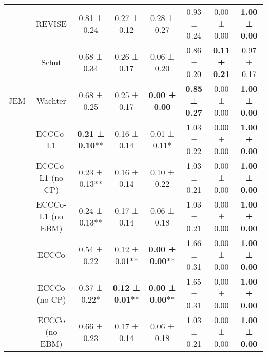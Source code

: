 \begin{table}
{\begin{tabular}[t]{cccccccc}
 & REVISE & 0.81 ± 0.24\hphantom{*}\hphantom{*} & 0.27 ± 0.12\hphantom{*}\hphantom{*} & 0.28 ± 0.27\hphantom{*}\hphantom{*} & 0.93 ± 0.24\hphantom{*}\hphantom{*} & 0.00 ± 0.00\hphantom{*}\hphantom{*} & \textbf{1.00 ± 0.00}\hphantom{*}\hphantom{*}\\

 & Schut & 0.68 ± 0.34\hphantom{*}\hphantom{*} & 0.26 ± 0.17\hphantom{*}\hphantom{*} & 0.06 ± 0.20\hphantom{*}\hphantom{*} & 0.86 ± 0.20\hphantom{*}\hphantom{*} & \textbf{0.11 ± 0.21}\hphantom{*}\hphantom{*} & 0.97 ± 0.17\hphantom{*}\hphantom{*}\\

\multirow[t]{-9}{*}{\centering\arraybackslash JEM} & Wachter & 0.68 ± 0.25\hphantom{*}\hphantom{*} & 0.25 ± 0.17\hphantom{*}\hphantom{*} & \textbf{0.00 ± 0.00}\hphantom{*}\hphantom{*} & \textbf{0.85 ± 0.27}\hphantom{*}\hphantom{*} & 0.00 ± 0.00\hphantom{*}\hphantom{*} & \textbf{1.00 ± 0.00}\hphantom{*}\hphantom{*}\\
\cmidrule{1-8}
 & ECCCo-L1 & \textbf{0.21 ± 0.10}** & 0.16 ± 0.14\hphantom{*}\hphantom{*} & 0.01 ± 0.11*\hphantom{*} & 1.03 ± 0.22\hphantom{*}\hphantom{*} & 0.00 ± 0.00\hphantom{*}\hphantom{*} & \textbf{1.00 ± 0.00}\hphantom{*}\hphantom{*}\\

 & ECCCo-L1 (no CP) & 0.23 ± 0.13** & 0.16 ± 0.14\hphantom{*}\hphantom{*} & 0.10 ± 0.22\hphantom{*}\hphantom{*} & 1.03 ± 0.21\hphantom{*}\hphantom{*} & 0.00 ± 0.00\hphantom{*}\hphantom{*} & \textbf{1.00 ± 0.00}\hphantom{*}\hphantom{*}\\

 & ECCCo-L1 (no EBM) & 0.24 ± 0.13** & 0.17 ± 0.14\hphantom{*}\hphantom{*} & 0.06 ± 0.18\hphantom{*}\hphantom{*} & 1.03 ± 0.21\hphantom{*}\hphantom{*} & 0.00 ± 0.00\hphantom{*}\hphantom{*} & \textbf{1.00 ± 0.00}\hphantom{*}\hphantom{*}\\

 & ECCCo & 0.54 ± 0.22\hphantom{*}\hphantom{*} & 0.12 ± 0.01** & \textbf{0.00 ± 0.00}** & 1.66 ± 0.31\hphantom{*}\hphantom{*} & 0.00 ± 0.00\hphantom{*}\hphantom{*} & \textbf{1.00 ± 0.00}\hphantom{*}\hphantom{*}\\

 & ECCCo (no CP) & 0.37 ± 0.22*\hphantom{*} & \textbf{0.12 ± 0.01}** & \textbf{0.00 ± 0.00}** & 1.65 ± 0.31\hphantom{*}\hphantom{*} & 0.00 ± 0.00\hphantom{*}\hphantom{*} & \textbf{1.00 ± 0.00}\hphantom{*}\hphantom{*}\\

 & ECCCo (no EBM) & 0.66 ± 0.23\hphantom{*}\hphantom{*} & 0.17 ± 0.14\hphantom{*}\hphantom{*} & 0.06 ± 0.18\hphantom{*}\hphantom{*} & 1.03 ± 0.21\hphantom{*}\hphantom{*} & 0.00 ± 0.00\hphantom{*}\hphantom{*} & \textbf{1.00 ± 0.00}\hphantom{*}\hphantom{*}\\


\end{tabular}}
\end{table}
